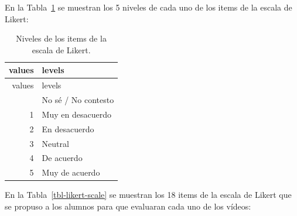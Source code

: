 \documentclass[
  12pt,
  a4paper,
  extrafontsizes,
  onecolumn,
  openright]{memoir}
\begin{document}
En la Tabla~\ref{tbl-likert-levels} se muestran los 5 niveles de cada
uno de los items de la escala de Likert:

\clearpage

\hypertarget{tbl-likert-levels}{}
\begin{longtable}[]{@{}rl@{}}
\caption{\label{tbl-likert-levels}Niveles de los items de la escala de
Likert.}\tabularnewline
\toprule\noalign{}
values & levels \\
\midrule\noalign{}
\endfirsthead
\toprule\noalign{}
values & levels \\
\midrule\noalign{}
\endhead
\bottomrule\noalign{}
\endlastfoot
0 & No sé / No contesto \\
1 & Muy en desacuerdo \\
2 & En desacuerdo \\
3 & Neutral \\
4 & De acuerdo \\
5 & Muy de acuerdo \\
\end{longtable}

En la Tabla~\ref{tbl-likert-scale} se muestran los 18 items de la escala
de Likert que se propuso a los alumnos para que evaluaran cada uno de
los vídeos:
\end{document}
